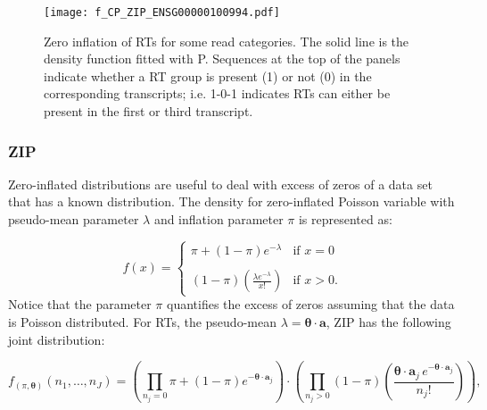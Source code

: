 \documentclass[11pt]{article}
\begin{document}
\begin{figure}[H]
  \centering
  \texttt{[image: f\_CP\_ZIP\_ENSG00000100994.pdf]}
  \caption{Zero inflation of RTs for some read categories. The solid line is the density function fitted with P. Sequences at the top of the panels indicate whether a RT group is present (1) or not (0) in the corresponding transcripts; i.e. 1-0-1 indicates RTs can either be present in the first or third transcript.}
  \label{example}
\end{figure}

\subsubsection{ZIP}
\label{zip}
Zero-inflated distributions are useful to deal with excess of zeros of a data set that has a known distribution. The density for zero-inflated Poisson variable with pseudo-mean parameter $\lambda$ and inflation parameter $\pi$ is represented as:
  
  \[f(x)=
    \begin{cases}
      \pi+(1-\pi)e^{-\lambda}& \text{if } x=0\\
      &\\
      (1-\pi)\left(\frac{\lambda e^{-\lambda}}{x!}\right)&  \text{if } x>0. 
    \end{cases}
  \]
\noindent Notice that the parameter $\pi$ quantifies the excess of zeros assuming that the data is Poisson distributed. For RTs, the pseudo-mean $\lambda=\boldsymbol{\theta}\cdot \mathbf{a}$, ZIP has the following joint distribution:
  
\begin{equation}
\label{ZIP_den}
f_{(\pi,\boldsymbol{\theta})}(n_1,\ldots,n_J)=\left(\prod_{n_j=0}\pi+(1-\pi)e^{-\boldsymbol{\theta}\cdot\mathbf{a}_j}\right)\cdot\left(\prod_{n_j>0}(1-\pi)\left(\frac{\boldsymbol{\theta}\cdot\mathbf{a}_j\,e^{-\boldsymbol{\theta}\cdot\mathbf{a}_j}}{n_j!}\right)\right),
\end{equation}
\end{document}
